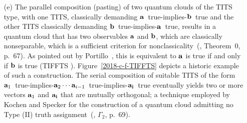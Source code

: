 \begin{enumerate}[leftmargin=2.3em,labelsep=4mm]
\item[(e)]
The parallel composition (pasting) of two quantum clouds of the TITS type, with one TITS, classically demanding ${\bf a}$~true-implies-${\bf b}$~true
and the other TITS classically demanding ${\bf b}$~true-implies-${\bf a}$~true, results in a quantum cloud that has two observables ${\bf a}$ and ${\bf b}$,
which are classically nonseparable, which is a sufficient criterion for nonclassicality~(\cite{Kochen1}, Theorem~0, p.~67).
As pointed out by Portillo~\cite{Portillo-2018-pc}, this is equivalent to ${\bf a}$ is true if and only if ${\bf b}$ is true (TIFFTS%
).
Figure~\ref{2018-c-f-TIFFTS} depicts a historic example of such a construction.
The serial composition of suitable TITS
of the form ${\bf a}_1$~true-implies-${\bf a}_2 \cdots {\bf a}_{i-1}$~true-implies-${\bf a_i}$~true
eventually yields two or more vectors ${\bf a}_1$ and ${\bf a_i}$ that are mutually orthogonal; a technique employed by Kochen and Specker
for the construction of a quantum cloud admitting no Type (II) truth assignment~(\cite{Kochen1}, $\Gamma_2$, p.~69).
\begin{figure}[H]
\newif\iflabel
\labelfalse
\begin{center}
\end{center}
\end{figure}
\end{enumerate}
